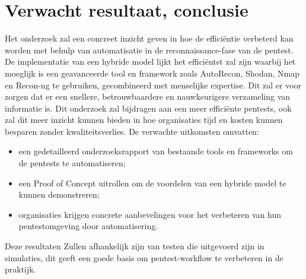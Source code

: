 

\section{Verwacht resultaat, conclusie}%
\label{sec:verwachte_resultaten}




Het onderzoek zal een concreet inzicht geven in hoe de efficiëntie verbeterd kan worden met behulp van
automatisatie in de reconnaissance-fase van de pentest. De implementatie van een hybride model lijkt het efficiëntst
zal zijn waarbij het moeglijk is een geavanceerde tool en framework zoals AutoRecon, Shodan, Nmap en Recon-ng te gebruiken,
gecombineerd met menselijke expertise. Dit zal er voor zorgen dat er een snellere, betrouwbaardere en nauwkeurigere verzameling van informatie is.
Dit onderzoek zal bijdragen aan een meer efficiënte pentests, ook zal dit meer inzicht kunnen bieden in hoe organisaties tijd en kosten
kunnen besparen zonder kwaliteitsverlies.
De verwachte uitkomsten omvatten:

\begin{itemize}
    \item een gedetailleerd onderzoeksrapport van bestaande tools en frameworks om de pentests te automatiseren;
    \item een Proof of Concept uitrollen om de voordelen van een hybride model te kunnen demonstreren;
    \item organisaties krijgen concrete aanbevelingen voor het verbeteren van hun pentestomgeving door automatisering.
\end{itemize}

Deze resultaten Zullen afhankelijk zijn van testen die uitgevoerd zijn in simulaties, dit geeft een goede basis om 
pentest-workflow te verbeteren in de praktijk.